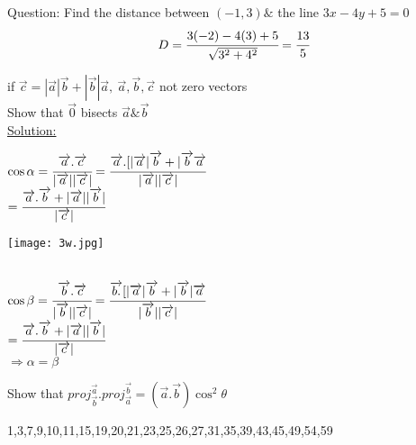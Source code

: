 {\color{smalt(darkpowderblue)}Question:} Find the distance between $(-1,3)\&$ the line $3x-4y+5=0$
$$D=\cfrac{3(-2)-4(3)+5}{\sqrt{3^2+4^2}}=\cfrac{13}{5}$$
\noindent{\color{smalt(darkpowderblue)}\rule{\linewidth}{.2mm}}
\begin{example}
if $\overrightarrow{c}=|\overrightarrow{a}|\overrightarrow{b}+|\overrightarrow{b}|\overrightarrow{a},~\overrightarrow{a},\overrightarrow{b},\overrightarrow{c}$ not zero vectors\\
Show that $\overrightarrow{0}$ bisects $\overrightarrow{a}\&\overrightarrow{b}$\\
{\color{smalt(darkpowderblue)}\underline{Solution:}} \\
\noindent\begin{minipage}{0.7\textwidth}
$\cos{\alpha}=\cfrac{\overrightarrow{a}.\overrightarrow{c}}{|\overrightarrow{a}||\overrightarrow{c}|}=\cfrac{\overrightarrow{a}.[|\overrightarrow{a}|\overrightarrow{b}+|\overrightarrow{b}\overrightarrow{a}}{|\overrightarrow{a}||\overrightarrow{c}|}$\\
$=\cfrac{\overrightarrow{a}.\overrightarrow{b}+|\overrightarrow{a}||\overrightarrow{b}|}{|\overrightarrow{c}|}$\\
\end{minipage}
\noindent\begin{minipage}{0.3\textwidth}
\texttt{[image: 3w.jpg]}
\end{minipage}\\
$\cos\beta=\cfrac{\overrightarrow{b}.\overrightarrow{c}}{|\overrightarrow{b}||\overrightarrow{c}|}=\cfrac{\overrightarrow{b.}[|\overrightarrow{a}|\overrightarrow{b}+|\overrightarrow{b}|\overrightarrow{a}}{|\overrightarrow{b}||\overrightarrow{c}|}$\\
$=\cfrac{\overrightarrow{a}.\overrightarrow{b}+|\overrightarrow{a}||\overrightarrow{b}|}{|\overrightarrow{c}|}$\\
$\Rightarrow\alpha=\beta$
\end{example}
\begin{exercise}
Show that $proj_{\overrightarrow{b}}^{\overrightarrow{a}}.proj_{\overrightarrow{a}}^{\overrightarrow{b}}=(\overrightarrow{a}.\overrightarrow{b})\cos^2\theta$
\end{exercise}
\noindent{\color{smalt(darkpowderblue)}\rule{\linewidth}{.2mm}}
\begin{problem}
1,3,7,9,10,11,15,19,20,21,23,25,26,27,31,35,39,43,45,49,54,59
\end{problem}
